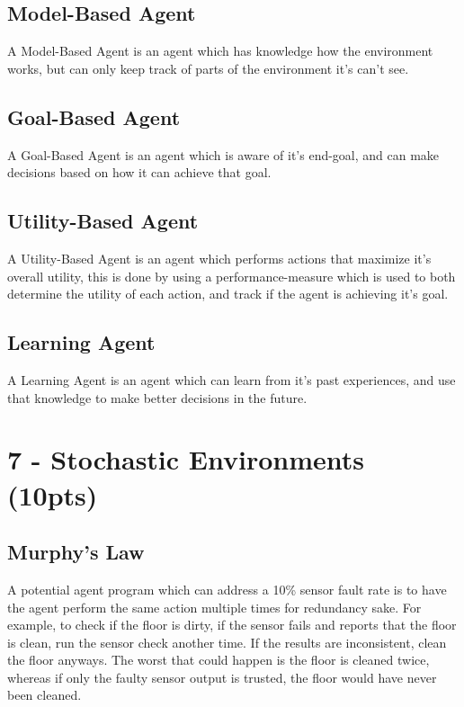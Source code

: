 \documentclass{article}
\begin{document}
\subsection*{Model-Based Agent}

A Model-Based Agent is an agent which has knowledge how the environment works, but can only keep track of parts of the environment it's can't see.

\subsection*{Goal-Based Agent}

A Goal-Based Agent is an agent which is aware of it's end-goal, and can make decisions based on how it can achieve that goal.

\subsection*{Utility-Based Agent}

A Utility-Based Agent is an agent which performs actions that maximize it's overall utility, this is done by using a performance-measure which is used to both determine the utility of each action, and track if the agent is achieving it's goal.

\subsection*{Learning Agent}

A Learning Agent is an agent which can learn from it's past experiences, and use that knowledge to make better decisions in the future.

\newpage
\section*{7 - Stochastic Environments (10pts)}

\subsection*{Murphy's Law}

A potential agent program which can address a 10\% sensor fault rate is to have the agent perform the same action multiple times for redundancy sake. For example, to check if the floor is dirty, if the sensor fails and reports that the floor is clean, run the sensor check another time. If the results are inconsistent, clean the floor anyways. The worst that could happen is the floor is cleaned twice, whereas if only the faulty sensor output is trusted, the floor would have never been cleaned.
\end{document}
